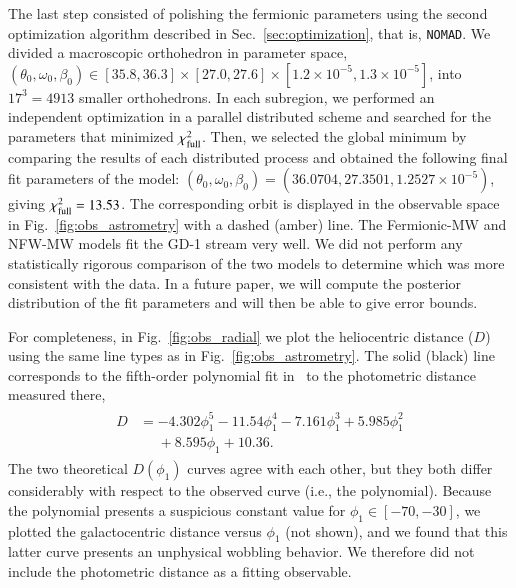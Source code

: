 \documentclass[twocolumn]{aa}
\begin{document}
The last step consisted of polishing the fermionic parameters using the second optimization algorithm described in Sec.~\ref{sec:optimization}, that is, \texttt{NOMAD}. We divided a  macroscopic orthohedron in parameter space, $(\theta_0, \omega_0, \beta_0) \in [35.8, 36.3]\times[27.0, 27.6]\times [1.2\times10^{-5}, 1.3\times10^{-5}]$, into $17^3=4913$ smaller orthohedrons. In each subregion, we performed an independent optimization in a parallel distributed scheme and searched for the parameters that minimized $\chi^2_{\rm{full}}$. Then, we selected the global minimum by comparing the results of each distributed process and obtained the following final fit parameters of the model: $(\theta_0, \omega_0, \beta_0)= (36.0704, 27.3501, 1.2527\times10^{-5})$, giving $\chi^2_{\rm{full}}= 13.53$.
The corresponding orbit is displayed in the observable space in
Fig.~\ref{fig:obs_astrometry} with a dashed (amber) line. The Fermionic-MW and NFW-MW models fit the GD-1 stream very well.
We did not perform any statistically rigorous comparison of the two models to determine which was more consistent with the data. In a future paper, we will compute the posterior distribution of the fit parameters and will then be able to give error bounds.


For completeness, in Fig.~\ref{fig:obs_radial} we plot the heliocentric distance ($D$) using the same line types as in Fig.~\ref{fig:obs_astrometry}. The solid (black) line corresponds to the fifth-order polynomial fit in~\cite{Ibata_2020} to the photometric distance measured there,
\begin{align}
 \label{phot_dist}
    \begin{split}
        D &= -4.302\phi_1^5 - 11.54\phi_1^4 - 7.161\phi_1^3 + 5.985\phi_1^2\\
      &\phantom{=} + 8.595\phi_1+10.36.
    \end{split}
\end{align}
The two theoretical $D(\phi_1)$ curves agree with each other, but they both differ considerably with respect to the observed curve (i.e., the polynomial). Because the polynomial presents a suspicious constant value for $\phi_1 \in [-70,-30]$, we plotted the galactocentric distance versus $\phi_1$ (not shown), and we found that this latter curve presents an unphysical wobbling behavior. We therefore did not include the photometric distance as a fitting observable.
\end{document}
